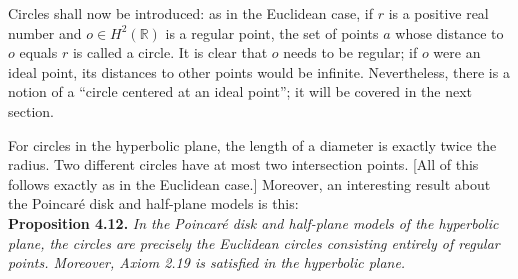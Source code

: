 \documentclass[leqno]{book}
\begin{document}
\noindent Circles shall now be introduced: as in the Euclidean case, if $r$ is a positive real number and $o\in H^2(\mathbb R)$ is a regular point, the set of points $a$ whose distance to $o$ equals $r$ is called a circle.  It is clear that $o$ needs to be regular; if $o$ were an ideal point, its distances to other points would be infinite.  Nevertheless, there is a notion of a ``circle centered at an ideal point''; it will be covered in the next section.

For circles in the hyperbolic plane, the length of a diameter is exactly twice the radius.  Two different circles have at most two intersection points.  [All of this follows exactly as in the Euclidean case.]  Moreover, an interesting result about the Poincar\'e disk and half-plane models is this:\\

\noindent\textbf{Proposition 4.12.} \emph{In the Poincar\'e disk and half-plane models of the hyperbolic plane, the circles are precisely the Euclidean circles consisting entirely of regular points.  Moreover, Axiom 2.19 is satisfied in the hyperbolic plane.}\\
\end{document}
